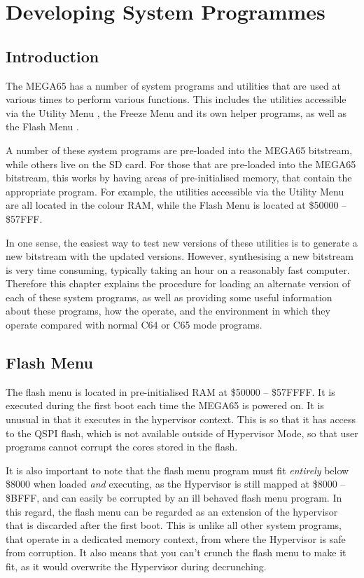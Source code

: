 \chapter{Developing System Programmes}

\section{Introduction}

The MEGA65 has a number of system programs and utilities that are used at various times to perform various functions.
This includes the utilities accessible via the Utility Menu , the Freeze Menu  and
its own helper programs, as well as the Flash Menu .

A number of these system programs are pre-loaded into the MEGA65 bitstream, while others live on the SD card.
For those that are pre-loaded into the MEGA65 bitstream, this works by having areas of pre-initialised memory, that
contain the appropriate program.  For example, the utilities accessible via the Utility Menu are all located in
the colour RAM, while the Flash Menu is located at \$50000 -- \$57FFF.

In one sense, the easiest way to test new versions of these utilities is to generate a new bitstream with the updated versions.
However, synthesising a new bitstream is very time consuming, typically taking an hour on a reasonably fast computer.
Therefore this chapter explains the procedure for loading an alternate version of each of these system programs, as well as
providing some useful information about these programs, how the operate, and the environment in which they operate compared
with normal C64 or C65 mode programs.

\section{Flash Menu}

The flash menu is located in pre-initialised RAM at \$50000 -- \$57FFFF.  It is executed during the first boot each time the
MEGA65 is powered on.  It is unusual in that it executes in the hypervisor context. This is so that it has access to the QSPI
flash, which is not available outside of Hypervisor Mode, so that user programs cannot corrupt the cores stored in the flash.

It is also important to note that the flash menu program must fit {\em entirely} below \$8000 when loaded {\em and} executing, as the Hypervisor is still mapped at \$8000 -- \$BFFF, and can easily be corrupted by an ill behaved flash menu program.  In this regard, the flash menu
can be regarded as an extension of the hypervisor that is discarded after the first boot.
This is unlike all other system programs, that operate in a dedicated memory context, from where the Hypervisor is safe from corruption. It also means that you can't crunch the flash menu to make it fit, as it would overwrite the Hypervisor during decrunching.

